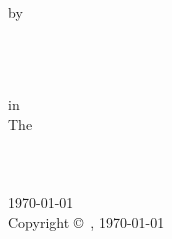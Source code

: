 

\begin{titlepage}
    \centering
    {\huge \ttitle}
    \\[1cm]

    by
    \\[1cm]

    {\Large \authorname}
    \\[1.5cm]

    \begin{minipage}{3in}
      \centering
    \end{minipage}
    \\[1.0cm]

    {\large \degreename}
    \\[1cm]

    in
    \\[1cm]

    \large{The \facname}
    \\
    \large{\deptname}
    \\[1cm]

    {\large \univname}
    \\[1.3cm]


    \addressname
    \\[0.3cm]
    \monthyeardate\today
    \\[0.5cm]

    {Copyright \copyright\ \authorname, \yeardate\today}
  \end{titlepage}

